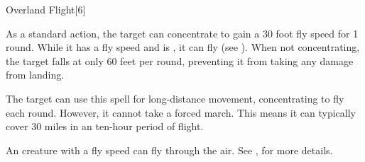 \begin{spellsection}{Overland Flight}[6]
    \begin{spellheader}
    \end{spellheader}
    \begin{spellcontent}
        \begin{spelltargetinginfo}
        \end{spelltargetinginfo}
        \begin{spelleffects}
            \spelleffect As a standard action, the target can concentrate to gain a 30 foot fly speed for 1 round.
            While it has a fly speed and is \unencumbered, it can fly (see ).
            When not concentrating, the target falls at only 60 feet per round, preventing it from taking any damage from landing.

            The target can use this spell for long-distance movement, concentrating to fly each round. However, it cannot take a forced march. This means it can typically cover 30 miles in an ten-hour period of flight.
            \spelldur \durext
        \end{spelleffects}
    \end{spellcontent}
    \begin{spellfooter}
        \spellnotes An \unencumbered creature with a fly speed can fly through the air. See , for more details.
    \end{spellfooter}
    \begin{spellaugments}
    \end{spellaugments}
\end{spellsection}

